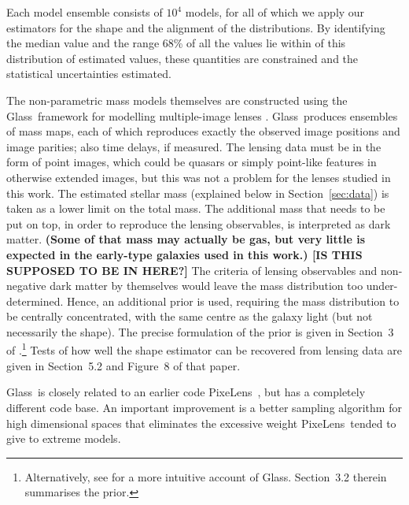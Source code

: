 \documentclass[useAMS,usenatbib]{mn2e}
\def\Glass{{\sc Glass}}
\def\PixeLens{{\sc PixeLens}}
\begin{document}
Each model ensemble consists of $10^4$ models, for all of which we apply our estimators for the shape and the alignment of the distributions. By identifying the median value and the range 68\% of all the values lie within of this distribution of estimated values, these quantities are constrained and the statistical uncertainties estimated.

The non-parametric mass models themselves are constructed using the \Glass\ framework for modelling multiple-image lenses \citep{2014MNRAS.445.2181C}. \Glass\ produces ensembles of mass maps, each of which reproduces exactly the observed image positions and image parities; also time delays, if measured. The lensing data must be in the form of point images, which could be quasars or simply point-like features in otherwise extended images, but this was not a problem for the lenses studied in this work. The estimated stellar mass (explained below in Section~\ref{sec:data}) is taken as a lower limit on the total mass. The additional mass that needs to be put on top, in order to reproduce the lensing observables, is interpreted as dark matter. \textbf{(Some of that mass may actually be gas, but very little is expected in the early-type galaxies used in this work.) [IS THIS SUPPOSED TO BE IN HERE?]} The criteria of lensing observables and non-negative dark matter by themselves would leave the mass distribution too under-determined. Hence, an additional prior is used, requiring the mass distribution to be centrally concentrated, with the same centre as the galaxy light (but not necessarily the shape). The precise formulation of the prior is given in Section~3 of \citet{2014MNRAS.445.2181C}.\footnote{Alternatively, see \citep{2015MNRAS.447.2170K} for a more intuitive account of \Glass.  Section~3.2 therein summarises the prior.} Tests of how well the shape estimator can be recovered from lensing data are given in Section~5.2 and Figure~8 of that paper.

\Glass\ is closely related to an earlier code \PixeLens\ \citep{2004AJ....127.2604S,2008ApJ...679...17C}, but has a completely different code base. An important improvement is a better sampling algorithm for high dimensional spaces \citep{2012MNRAS.425.3077L} that eliminates the excessive weight \PixeLens\ tended to give to extreme models.
\end{document}
